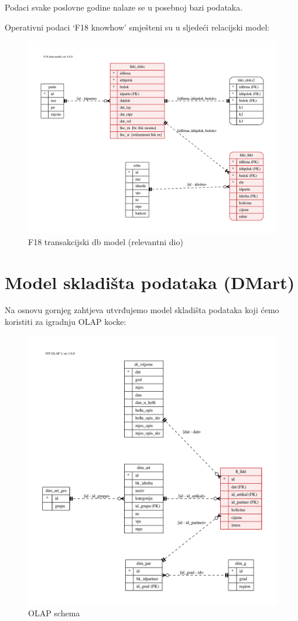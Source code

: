 \documentclass[times, utf8, seminar]{fit}
\begin{document}
Podaci svake poslovne godine nalaze se u posebnoj bazi podataka.

Operativni podaci `F18 knowhow' smješteni su u sljedeći relacijski model:

\begin{figure}[H]
\centering
\includegraphics[width=15cm]{img/F18_db.pdf}
\caption{F18 transakcijski db model (relevantni dio)}
\end{figure}

\section{Model skladišta podataka (DMart)}

Na osnovu gornjeg zahtjeva utvrđujemo model skladišta podataka koji ćemo koristiti za igradnju OLAP kocke:

\begin{figure}[H]
\centering
\includegraphics[width=15cm]{img/F18_olap.pdf}
\caption{OLAP schema}
\end{figure}
\end{document}
